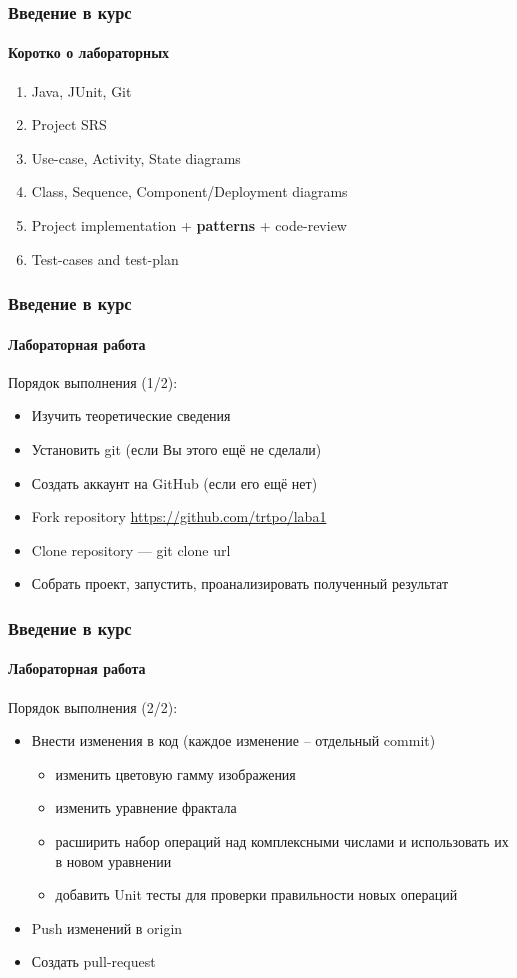 \documentclass[aspectratio=169, 12pt]{beamer}
\begin{document}
\begin{frame}
    \frametitle{Введение в курс}
    \framesubtitle{Коротко о лабораторных} \pause
    \begin{enumerate}
        \item Java, JUnit, Git \pause
        \item Project SRS \pause
        \item Use-case, Activity, State diagrams \pause
        \item Class, Sequence, Component/Deployment diagrams \pause
        \item Project implementation + \textbf{patterns} + code-review \pause
        \item Test-cases and test-plan
    \end{enumerate}
\end{frame}

\begin{frame}[t]
    \frametitle{Введение в курс}
    \framesubtitle{Лабораторная работа }
    Порядок выполнения (1/2): \pause
    \begin{itemize}
        \item Изучить теоретические сведения \pause
        \item Установить git (если Вы этого ещё не сделали) \pause
        \item Создать аккаунт на GitHub (если его ещё нет) \pause
        \item Fork repository \url{https://github.com/trtpo/laba1} \pause
        \item Clone repository --- git clone url \pause
        \item Собрать проект, запустить, проанализировать полученный результат
    \end{itemize}
\end{frame}

\begin{frame}[t]
    \frametitle{Введение в курс}
    \framesubtitle{Лабораторная работа }
    Порядок выполнения (2/2): \pause
    \begin{itemize}
        \item Внести изменения в код (каждое изменение – отдельный commit) \pause
        \begin{itemize}
            \item изменить цветовую гамму изображения \pause
            \item изменить уравнение фрактала \pause
            \item расширить набор операций над комплексными числами и использовать их в новом уравнении \pause
            \item добавить Unit тесты для проверки правильности новых операций \pause
        \end{itemize}
        \item Push изменений в origin \pause
        \item Создать pull-request
    \end{itemize}
\end{frame}
\end{document}
